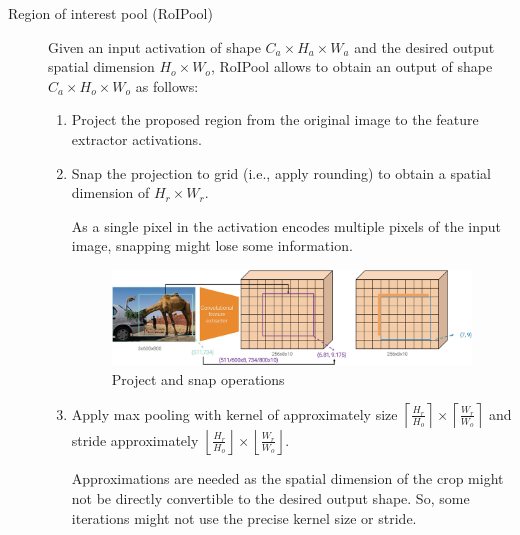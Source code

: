 \begin{description}
        \begin{description}
            \item[Region of interest pool (RoIPool)] 
                Given an input activation of shape $C_a \times H_a \times W_a$ and the desired output spatial dimension $H_o \times W_o$, RoIPool allows to obtain an output of shape $C_a \times H_o \times W_o$ as follows:
                \begin{enumerate}
                    \item Project the proposed region from the original image to the feature extractor activations.
                    \item Snap the projection to grid (i.e., apply rounding) to obtain a spatial dimension of $H_r \times W_r$.
                        \begin{remark}
                            As a single pixel in the activation encodes multiple pixels of the input image, snapping might lose some information.
                        \end{remark}
                        \begin{figure}[H]
                            \raggedleft
                            \includegraphics[width=0.8\linewidth]{./img/_roipool_snap.jpg}
                            \caption{Project and snap operations}
                        \end{figure}
                    \item Apply max pooling with kernel of approximately size $\left\lceil \frac{H_r}{H_o} \right\rceil \times \left\lceil \frac{W_r}{W_o} \right\rceil$ and stride approximately $\left\lfloor \frac{H_r}{H_o} \right\rfloor \times \left\lfloor \frac{W_r}{W_o} \right\rfloor$.
                        \begin{remark}
                            Approximations are needed as the spatial dimension of the crop might not be directly convertible to the desired output shape. So, some iterations might not use the precise kernel size or stride.
                        \end{remark}
                        \begin{figure}[H]
                            \raggedleft

\end{figure}
\end{enumerate}
\end{description}
\end{description}
